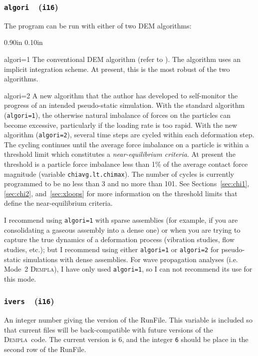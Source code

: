 \documentclass[letterpaper,11pt]{article}
\newcommand{\Dempla}{\textsc{Dempla}}
\newcommand{\Var}[2]{\texttt{#1}\ \  (\texttt{#2})}
\newcommand{\RunFile}{\textsf{RunFile}}
\newlength{\Labelwidth}
\newcommand{\Entrylabel}[1]{\makebox[\Labelwidth][r]{\texttt{#1}}}
\newenvironment{Options}
{\begin{list}{}{%
\renewcommand{\makelabel}{\Entrylabel}%
\setlength{\leftmargin} {0.90in}%
\setlength{\rightmargin}{0.00in}%
\setlength{\labelsep}   {0.10in}%
\setlength{\labelwidth} {\Labelwidth}%
}}
{\end{list}}
\begin{document}
\subsubsection[\texttt{algori}]{\Var{algori}{i16}}\label{sec:algori}
The program can be run with either of two DEM algorithms:
\begin{Options}
\item[algori=1]
The conventional DEM algorithm (refer to \citep{Cundall:1979a}).
The algorithm uses an implicit integration scheme.
At present, this is the most robust of the two algorithms.
\item[algori=2]
A new algorithm that the author has developed to self-monitor
the progress of an intended pseudo-static simulation.
With the standard algorithm (\texttt{algori=1}), the
otherwise natural imbalance of forces on the particles can
become excessive, particularly if the loading rate is
too rapid.
With the new algorithm (\texttt{algori=2}), 
several time steps are cycled within
each deformation step.
The cycling continues until the average force imbalance on a particle
is within a threshold limit which constitutes a
\emph{near-equilibrium criteria}.
At present the threshold is a particle force imbalance less than 1\%
of the average contact force magnitude
(variable \texttt{chiavg.lt.chimax}).
The number of cycles is currently programmed to be no less than 3 and 
no more than 101.
See Sections~\ref{sec:chi1}, \ref{sec:chi2}, and~\ref{sec:xloops}
for more information on the threshold limits that define
the near-equilibrium criteria.
\par
I recommend using \texttt{algori=1} with sparse assemblies
(for example, if you are consolidating a gaseous assembly into a
dense one) or when you are trying to capture the true dynamics of 
a deformation process (vibration studies, flow studies, etc.);
but I recommend using either
\texttt{algori=1} or \texttt{algori=2} for pseudo-static simulations
with dense assemblies.
For wave propagation analyses (i.e. Mode~2 \Dempla ),
I have only used \texttt{algori=1},
so I can not recommend its use for this mode.
\end{Options}
\subsubsection[\texttt{ivers}]{\Var{ivers}{i16}}\label{sec:ivers}
An integer number giving the version of the \RunFile.
This variable is included so that current files
will be back-compatible with future versions
of the \Dempla\ code.
The current version is 6,
and the integer
\texttt{6} should be place in the second row of the \RunFile.
%
%
\end{document}
